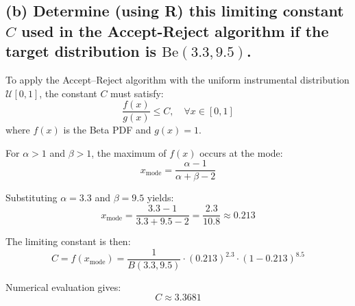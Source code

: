 






\newpage
\subsection*{(b) Determine (using R) this limiting constant $C$ used in the Accept-Reject algorithm if the target distribution is $\text{Be}(3.3, 9.5)$.}

To apply the Accept–Reject algorithm with the uniform instrumental distribution \(\mathcal{U}[0, 1]\), the constant \(C\) must satisfy:
\begin{equation}
\frac{f(x)}{g(x)} \leq C, \quad \forall x \in [0, 1]
\end{equation}
where \(f(x)\) is the Beta PDF and \(g(x) = 1\).

For \(\alpha > 1\) and \(\beta > 1\), the maximum of \(f(x)\) occurs at the mode:
\begin{equation}
x_{\text{mode}} = \frac{\alpha - 1}{\alpha + \beta - 2}
\end{equation}

Substituting \(\alpha = 3.3\) and \(\beta = 9.5\) yields:
\[
x_{\text{mode}} = \frac{3.3 - 1}{3.3 + 9.5 - 2} = \frac{2.3}{10.8} \approx 0.213
\]

The limiting constant is then:
\[
C = f(x_{\text{mode}}) = \frac{1}{B(3.3, 9.5)} \cdot (0.213)^{2.3} \cdot (1 - 0.213)^{8.5}
\]

Numerical evaluation gives:
\[
C \approx 3.3681
\]






